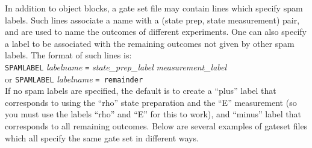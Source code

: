 \documentclass{article}[11pt]
\begin{document}
\begin{itemize}
\begin{enumerate}
\end{enumerate}
\noindent In addition to object blocks, a gate set file may contain lines which specify spam labels.  Such lines associate a name with a (state prep, state measurement) pair, and are used to name the outcomes of different experiments. One can also specify a label to be associated with the remaining outcomes not given by other spam labels. The format of such lines is:\\
\texttt{SPAMLABEL} \emph{labelname} \texttt{=} \emph{state\_prep\_label} \emph{measurement\_label} \\
\noindent or
\texttt{SPAMLABEL} \emph{labelname} \texttt{= remainder} \\
\noindent If no spam labels are specified, the default is to create a ``plus'' label that corresponds to using the ``rho'' state preparation and the ``E'' measurement (so you must use the labels ``rho'' and ``E'' for this to work), and ``minus'' label that corresponds to all remaining outcomes.  Below are several examples of gateset files which all specify the same gate set in different ways.



%


\end{itemize}
\end{document}
